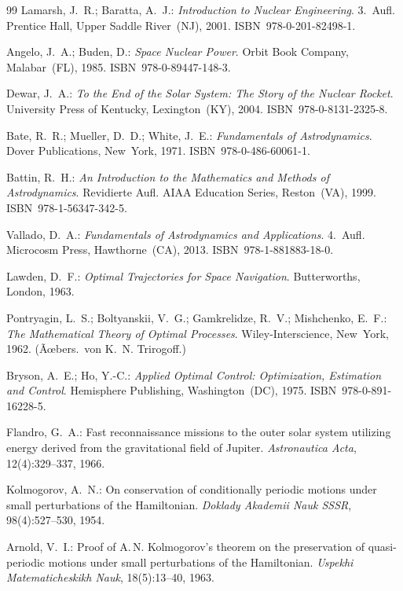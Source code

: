 ﻿\documentclass[a4paper,12pt,twoside]{article}
\theoremstyle{plain}
\theoremstyle{definition}
\theoremstyle{remark}
\begin{document}
\begin{thebibliography}{99}
	Lamarsh, J.~R.; Baratta, A.~J.:
	\textit{Introduction to Nuclear Engineering}.
	3.~Aufl. Prentice Hall, Upper Saddle River~(NJ), 2001.
	ISBN~978-0-201-82498-1.

	Angelo, J.~A.; Buden, D.:
	\textit{Space Nuclear Power}.
	Orbit Book Company, Malabar~(FL), 1985.
	ISBN~978-0-89447-148-3.

	Dewar, J.~A.:
	\textit{To the End of the Solar System: The Story of the Nuclear Rocket}.
	University Press of Kentucky, Lexington~(KY), 2004.
	ISBN~978-0-8131-2325-8.

	Bate, R.~R.; Mueller, D.~D.; White, J.~E.:
	\textit{Fundamentals of Astrodynamics}.
	Dover Publications, New~York, 1971.
	ISBN~978-0-486-60061-1.

	Battin, R.~H.:
	\textit{An Introduction to the Mathematics and Methods of Astrodynamics}.
	Revidierte Aufl. AIAA Education Series, Reston~(VA), 1999.
	ISBN~978-1-56347-342-5.

	Vallado, D.~A.:
	\textit{Fundamentals of Astrodynamics and Applications}.
	4.~Aufl. Microcosm Press, Hawthorne~(CA), 2013.
	ISBN~978-1-881883-18-0.

	Lawden, D.~F.:
	\textit{Optimal Trajectories for Space Navigation}.
	Butterworths, London, 1963.

	Pontryagin, L.~S.; Boltyanskii, V.~G.; Gamkrelidze, R.~V.;
	Mishchenko, E.~F.:
	\textit{The Mathematical Theory of Optimal Processes}.
	Wiley-Interscience, New~York, 1962.
	(Ãœbers.\ von K.~N. Trirogoff.)

	Bryson, A.~E.; Ho, Y.-C.:
	\textit{Applied Optimal Control: Optimization, Estimation and Control}.
	Hemisphere Publishing, Washington~(DC), 1975.
	ISBN~978-0-891-16228-5.

	Flandro, G.~A.:
	Fast reconnaissance missions to the outer solar system utilizing energy
	derived from the gravitational field of Jupiter.
	\textit{Astronautica Acta}, 12(4):329--337, 1966.

	Kolmogorov, A.~N.:
	On conservation of conditionally periodic motions under small perturbations
	of the Hamiltonian.
	\textit{Doklady Akademii Nauk SSSR}, 98(4):527--530, 1954.

	Arnold, V.~I.:
	Proof of A.\,N. Kolmogorov's theorem on the preservation of quasi-periodic
	motions under small perturbations of the Hamiltonian.
	\textit{Uspekhi Matematicheskikh Nauk}, 18(5):13--40, 1963.


\end{thebibliography}
\end{document}
